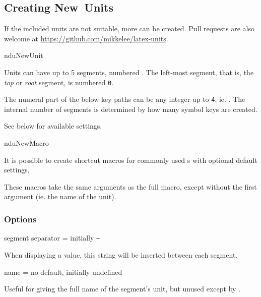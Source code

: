 \documentclass{article}
\begin{document}
\subsection{Creating New Units} %

\label{units:new}
If the included units are not suitable, more can be created. Pull requests are also welcome at \url{https://github.com/mikkelee/latex-units}.

\begin{docCommand}
	{nduNewUnit}
	{}
	
Units can have up to 5 segments, numbered . The left-most segment, that is, the \emph{top} or \emph{root} segment, is numbered \texttt{0}.

The numeral part of the below key paths  can be any integer up to \texttt{4}, ie. . The internal number of segments is determined by how many symbol keys are created.

See below for available settings.

\end{docCommand}

\begin{docCommand}
	{nduNewMacro}
	{}

	It is possible to create shortcut macros for commonly used s with optional default settings.

	These macros take the same arguments as the full  macro, except without the first argument (ie. the name of the unit).

\end{docCommand}


\subsubsection{Options}

\begin{docKey}
	{segment separator}
	{=}
	{initially \texttt{\~{}}}
	
	When displaying a value, this string will be inserted between each segment.
\end{docKey}

\begin{docKey}
	[segment 0]{name}
	{=}
	{no default, initially undefined}

	Useful for giving the full name of the segment's unit, but unused except by .
\end{docKey}
\end{document}
